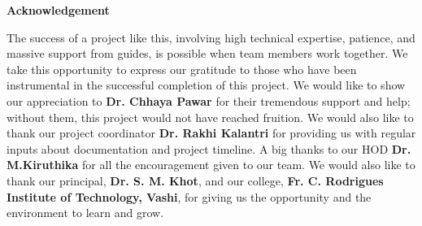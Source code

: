 
\begin{centering}
    \large
{\LARGE\bf Acknowledgement}\\
\end{centering}
    
\justify
The success of a project like this, involving high technical expertise, patience, and massive support from guides, is possible when team members work together. We take this opportunity to express our gratitude to those who have been instrumental in the successful completion of this project. We would like to show our appreciation to \textbf{Dr. Chhaya Pawar} for their tremendous support and help; without them, this project would not have reached fruition. We would also like to thank our project coordinator \textbf{Dr. Rakhi Kalantri} for providing us with regular inputs about documentation and project timeline. A big thanks to our HOD \textbf{Dr. M.Kiruthika } for all the encouragement given to our team. We would also like to thank our principal, \textbf{Dr. S. M. Khot}, and our college, \textbf{Fr. C. Rodrigues Institute of Technology, Vashi}, for giving us the opportunity and the environment to learn and grow.

